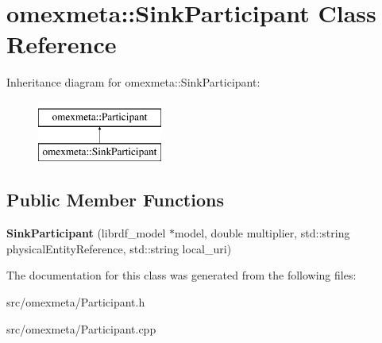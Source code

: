 \hypertarget{classomexmeta_1_1SinkParticipant}{}\section{omexmeta\+:\+:Sink\+Participant Class Reference}
\label{classomexmeta_1_1SinkParticipant}
Inheritance diagram for omexmeta\+:\+:Sink\+Participant\+:\begin{figure}[H]
\begin{center}
\leavevmode
\includegraphics[height=2.000000cm]{classomexmeta_1_1SinkParticipant}
\end{center}
\end{figure}
\subsection*{Public Member Functions}
\begin{DoxyCompactItemize}
\item 
\mbox{\label{classomexmeta_1_1SinkParticipant_a059d7eeab0b228f1e47d2928beb5ca05}} 
{\bfseries Sink\+Participant} (librdf\+\_\+model $\ast$model, double multiplier, std\+::string physical\+Entity\+Reference, std\+::string local\+\_\+uri)
\end{DoxyCompactItemize}


The documentation for this class was generated from the following files\+:\begin{DoxyCompactItemize}
\item 
src/omexmeta/Participant.\+h\item 
src/omexmeta/Participant.\+cpp\end{DoxyCompactItemize}
